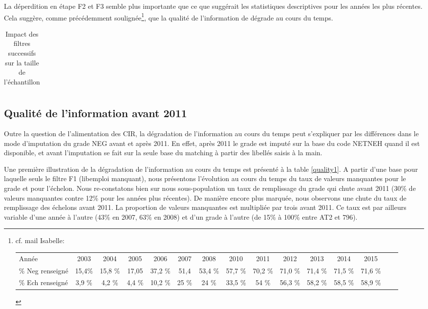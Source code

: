 \documentclass[11pt,a4paper]{article}
\begin{document}
La déperdition en étape F2 et F3 semble plus importante que ce que suggérait les statistiques descriptives pour les années les plus récentes. Cela suggère, comme précédemment soulignée\footnote{cf. mail Isabelle:  \\
\scriptsize
\begin{tabular}{lcccccccccccccc}
Année &2003&	2004 &	2005&	2006&	2007&	2008	&2010	&2011	&2012	&2013	&2014	&2015 \\
\% Neg renseigné & 15,4\%&	15,8 \% &	17,05	& 37,2 \%	&51,4 &	53,4 \% &	57,7 \%&	70,2 \%&	71,0 \% & 	71,4 \%	&71,5 \%&	71,6 \% \\
\% Ech renseigné &  3,9 \%	& 4,2 \%&	4,4 \%	&10,2 \% 	&25 \%	&24 \%	&33,5 \% &	54 \%&	56,3 \%&	58,2 \%	&58,5 \%	&58,9 \% \\
\end{tabular}
}, que la qualité de l'information de dégrade au cours du temps. 


\begin{table}[h!]
\centering
\caption{Impact des filtres successifs sur la taille de l'échantillon} 
\label{filters_AT}
\begin{tabular}{lcc}
\toprule

\bottomrule
\end{tabular}
\end{table}



\subsection{Qualité de l'information avant 2011}

Outre la question de l'alimentation des CIR, la dégradation de l'information au cours du temps peut s'expliquer par les différences dans le mode d'imputation du grade NEG avant et après 2011. En effet, après 2011 le grade est imputé sur la base du code NETNEH quand il est disponible, et avant l'imputation se fait sur la seule base du matching à partir des libellés saisis à la main. 

Une première illustration de la dégradation de l'information au cours du temps est présenté à la table \ref{quality1}. A partir d'une base pour laquelle seuls le filtre F1 (libemploi manquant), nous présentons l'évolution au cours du temps du taux de valeurs manquantes pour le grade et pour l'échelon. 
Nous re-constatons bien sur nous sous-population un taux de remplissage du grade qui chute avant 2011 (30\% de valeurs manquantes contre 12\% pour les années plus récentes). De manière encore plus marquée, nous observons une chute du taux de remplissage des échelons avant 2011. La proportion de valeurs manquantes est multipliée par trois avant 2011. Ce taux est par ailleurs variable d'une année à l'autre (43\% en 2007, 63\% en 2008) et d'un grade à l'autre (de 15\% à 100\% entre AT2 et 796). 
\end{document}
